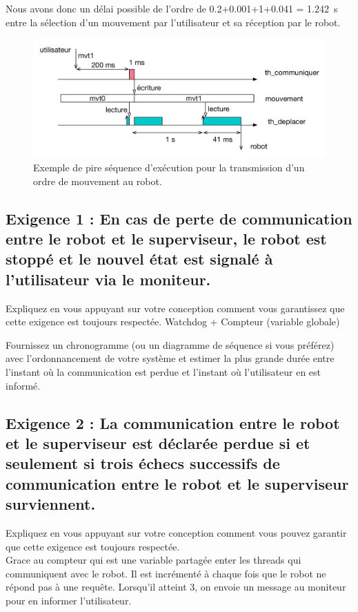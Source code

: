 \documentclass[11pt, a4paper]{paper}
\begin{document}
{Nous avons donc un délai possible de l'ordre de 0.2+0.001+1+0.041 = 1.242~s entre la sélection d'un mouvement par l'utilisateur et sa réception par le robot.

\begin{figure}[htbp]
\begin{center}
\includegraphics[scale=0.6]{./figures-pdf/sequence}
\caption{\color{red}Exemple de pire séquence d'exécution pour la transmission d'un ordre de mouvement au robot.}
\label{fig:seq}
\end{center}
\end{figure}
}

\subsection{Exigence 1 : En cas de perte de communication entre le robot et le superviseur, le robot est stoppé et le nouvel état est signalé à l'utilisateur via le moniteur.}

{\color{blue} Expliquez en vous appuyant sur votre conception comment vous garantissez que cette exigence est toujours respectée.}
{\color{black} Watchdog + Compteur (variable globale)}

{\color{blue} Fournissez un chronogramme (ou un diagramme de séquence si vous préférez) avec l’ordonnancement de votre système et estimer la plus grande durée entre l'instant où la communication est perdue et l'instant où l'utilisateur en est informé.}

\subsection{Exigence 2 : La communication entre le robot et le superviseur est déclarée perdue si et seulement si trois échecs successifs de communication entre le robot et le superviseur surviennent.}

{\color{blue} Expliquez en vous appuyant sur votre conception comment vous pouvez garantir que cette exigence est toujours respectée.\\}
{\color{black} Grace au compteur qui est une variable partagée enter les threads qui communiquent avec le robot. Il est incrémenté à chaque fois que le robot ne répond pas à une requête. Lorsqu'il atteint 3, on envoie un message au moniteur pour en informer l'utilisateur.}
\end{document}
